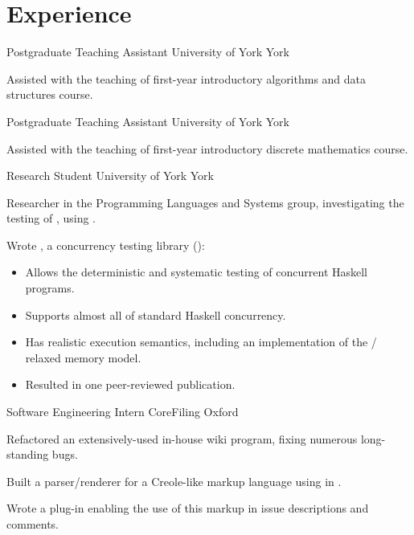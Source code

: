 \documentclass[a4paper]{barrucadu-cv}
\begin{document}
\section{Experience}

  {Postgraduate Teaching Assistant}
  {University of York}
  {York}
  {\begin{tightitemize}
    \item Assisted with the teaching of first-year introductory
      algorithms and data structures course.
    \end{tightitemize}}

  {Postgraduate Teaching Assistant}
  {University of York}
  {York}
  {\begin{tightitemize}
    \item Assisted with the teaching of first-year introductory
      discrete mathematics course.
    \end{tightitemize}}

  {Research Student}
  {University of York}
  {York}
  {\begin{tightitemize}
    \item Researcher in the Programming Languages and Systems group,
      investigating the testing of ,
      using .
    \item Wrote , a concurrency testing library
      ():
      \begin{itemize}
      \item Allows the deterministic and systematic testing of
        concurrent Haskell programs.
      \item Supports almost all of standard Haskell concurrency.
      \item Has realistic execution semantics, including an
        implementation of the  / 
        relaxed memory model.
      \item Resulted in one peer-reviewed publication.
      \end{itemize}
    \end{tightitemize}}

  {Software Engineering Intern}
  {CoreFiling}
  {Oxford}
  {\begin{tightitemize}
    \item Refactored an extensively-used in-house wiki program, fixing
      numerous long-standing bugs.
    \item Built a parser/renderer for a Creole-like markup language
      using  in .
    \item Wrote a  plug-in enabling the use of this
      markup in issue descriptions and comments.
    \end{tightitemize}}
\end{document}
